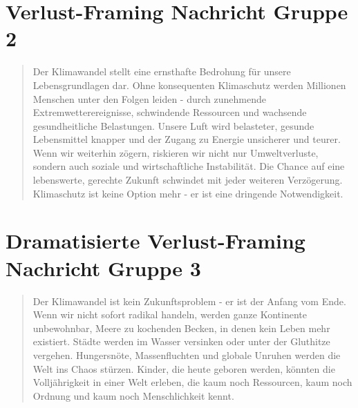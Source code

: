 \documentclass[12pt,twoside=off,
bibtotoc,liststotoc,appendixprefix,paper=a4,headings=small]{scrbook} %
\begin{document}
\section{Verlust-Framing Nachricht Gruppe 2}\label{app:messages:loss}
\begin{quote}
  Der Klimawandel stellt eine ernsthafte Bedrohung für unsere Lebensgrundlagen dar. Ohne konsequenten Klimaschutz werden Millionen Menschen unter den Folgen leiden - durch zunehmende Extremwetterereignisse, schwindende Ressourcen und wachsende gesundheitliche Belastungen. Unsere Luft wird belasteter, gesunde Lebensmittel knapper und der Zugang zu Energie unsicherer und teurer. 
Wenn wir weiterhin zögern, riskieren wir nicht nur Umweltverluste, sondern auch soziale und wirtschaftliche Instabilität. Die Chance auf eine lebenswerte, gerechte Zukunft schwindet mit jeder weiteren Verzögerung. Klimaschutz ist keine Option mehr - er ist eine dringende Notwendigkeit.
\end{quote}
\section{Dramatisierte Verlust-Framing Nachricht Gruppe 3}\label{app:messages:drama}
\begin{quote}
  Der Klimawandel ist kein Zukunftsproblem - er ist der Anfang vom Ende. Wenn wir nicht sofort radikal handeln, werden ganze Kontinente unbewohnbar, Meere zu kochenden Becken, in denen kein Leben mehr existiert. Städte werden im Wasser versinken oder unter der Gluthitze vergehen. Hungersnöte, Massenfluchten und globale Unruhen werden die Welt ins Chaos stürzen. Kinder, die heute geboren werden, könnten die Volljährigkeit in einer Welt erleben, die kaum noch Ressourcen, kaum noch Ordnung und kaum noch Menschlichkeit kennt.

\end{quote}
\end{document}
